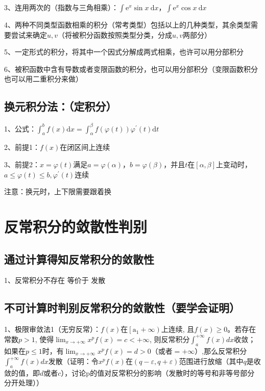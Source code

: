 3、连用两次的（指数与三角相乘）：$\int \mathrm{e}^{x} \sin x \mathrm{~d} x$，$\int \mathrm{e}^{x} \cos x \mathrm{~d} x$

4、两种不同类型函数相乘的积分（常考类型）包括以上的几种类型，其余类型需要尝试来确定$u,v$（将被积分函数按照类型分类，分成$u,v$两部分）

5、一定形式的积分，将其中一个因式分解成两式相乘，也许可以用分部积分

6、被积函数中含有导数或者变限函数的积分，也可以用分部积分（变限函数积分也可以用二重积分来做）



\subsection{换元积分法：（定积分）}

1、公式：$\int_{a}^{b} f(x) \mathrm{d} x=\int_{\alpha}^{\beta} f(\varphi(t)) \varphi^{\prime}(t) \mathrm{d} t$

2、前提1：$f(x)$在闭区间上连续

3、前提2：$x=\varphi(t)$满足$a=\varphi(\alpha)$，$b=\varphi(\beta)$，并且$t$在$[{\alpha},{\beta}]$上变动时，$a \leqslant \varphi(t) \leqslant b, \varphi^{\prime}(t)$连续

注意：换元时，上下限需要跟着换

\section{反常积分的敛散性判别}



\subsection{通过计算得知反常积分的敛散性}

1、反常积分不存在 等价于 发散



\subsection{不可计算时判别反常积分的敛散性（要学会证明）}

1、极限审敛法1（无穷反常）：$f(x)$在$\left[\mathrm{a}_{1}+\infty\right)$上连续, 且$f(x) \geqslant 0$。若存在常数$p>1$, 使得$ \lim_{x \rightarrow+\infty} x^{p} f(x)=c<+\infty$, 则反常积分$\int_{a}^{+\infty} f(x) d x$收敛；如果在$p \leqslant 1$时，有$\lim_{x \rightarrow+\infty} x^{p} f(x)=d>0$（或者$=+\infty$）,那么反常积分$\int_{a}^{+\infty} f({x}) dx$发散（证明：令$x^{p} f(x)$在$(q-\varepsilon,q+\varepsilon)$范围进行放缩（其中$q$是收敛的值，即$d$或者$c$），讨论p的值对反常积分的影响（发散时的等号和非等号部分分开处理））

